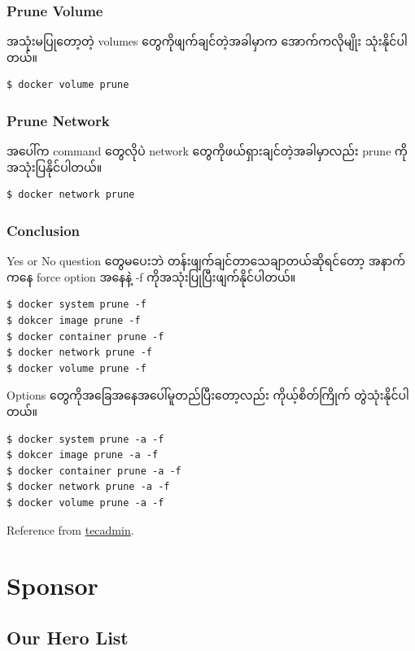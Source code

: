 \documentclass{article}
\begin{document}
\subsubsection{Prune Volume}\label{prune-volume}

အသုံးမပြုတော့တဲ့ volumes တွေကိုဖျက်ချင်တဲ့အခါမှာက အောက်ကလိုမျိုး
သုံးနိုင်ပါတယ်။

\begin{verbatim}
$ docker volume prune
\end{verbatim}

\subsubsection{Prune Network}\label{prune-network}

အပေါ်က command တွေလိုပဲ network တွေကိုဖယ်ရှားချင်တဲ့အခါမှာလည်း prune
ကိုအသုံးပြနိုင်ပါတယ်။

\begin{verbatim}
$ docker network prune
\end{verbatim}

\subsubsection{Conclusion}\label{conclusion}

Yes or No question တွေမပေးဘဲ တန်းဖျက်ချင်တာသေချာတယ်ဆိုရင်တော့ အနာက်ကနေ
force option အနေနဲ့ -f ကိုအသုံးပြုပြီးဖျက်နိုင်ပါတယ်။

\begin{verbatim}
$ docker system prune -f
$ dokcer image prune -f
$ docker container prune -f
$ docker network prune -f
$ docker volume prune -f
\end{verbatim}

Options တွေကိုအခြေအနေအပေါ်မူတည်ပြီးတော့လည်း ကိုယ့်စိတ်ကြိုက်
တွဲသုံးနိုင်ပါတယ်။

\begin{verbatim}
$ docker system prune -a -f
$ dokcer image prune -a -f
$ docker container prune -a -f
$ docker network prune -a -f
$ docker volume prune -a -f
\end{verbatim}

Reference from
\href{https://tecadmin.net/tutorial/docker/docker-prune-unused-objects/}{tecadmin}.

\section{Sponsor}\label{sponsor}

\subsection{Our Hero List}\label{our-hero-list}
\end{document}
